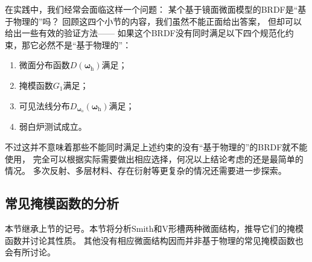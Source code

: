 在实践中，我们经常会面临这样一个问题：
某个基于镜面微面模型的BRDF是“基于物理的”吗？
回顾这四个小节的内容，我们虽然不能正面给出答案，
但却可以给出一些有效的验证方法——
如果这个BRDF没有同时满足以下四个规范化约束，那它必然不是“基于物理的”：
\begin{enumerate}
    \item 微面分布函数$D({\bm\omega}_{\mathrm{h}})$满足；
    \item 掩模函数$G_1$满足；
    \item 可见法线分布$D_{{\bm\omega}_{\mathrm{o}}}({\bm\omega}_{\mathrm{h}})$满足；
    \item 弱白炉测试成立。
\end{enumerate}
不过这并不意味着那些不能同时满足上述约束的没有“基于物理的”的BRDF就不能使用，
完全可以根据实际需要做出相应选择，何况以上结论考虑的还是最简单的情况。
多次反射、多层材料、存在衍射等更复杂的情况还需要进一步探索。

\subsection{常见掩模函数的分析}\label{sub:常见掩模函数的分析}
本节继承上节的记号。本节将分析Smith和V形槽两种微面结构，推导它们的掩模函数并讨论其性质。
其他没有相应微面结构因而并非基于物理的常见掩模函数也会有所讨论。

